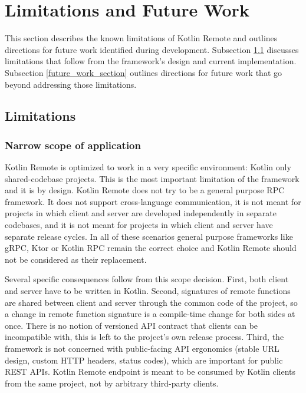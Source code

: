 \documentclass[a4paper,11pt,oneside]{article}
\begin{document}
\section{Limitations and Future Work}\label{limitations_and_future_work_section}

This section describes the known limitations of Kotlin Remote and outlines directions for
future work identified during development. Subsection \ref{limitations_section} discusses
limitations that follow from the framework's design and current implementation. Subsection
\ref{future_work_section} outlines directions for future work that go beyond addressing
those limitations.

\subsection{Limitations}\label{limitations_section}

\subsubsection{Narrow scope of application}\label{narrow_scope_section}

Kotlin Remote is optimized to work in a very specific environment: Kotlin only shared-codebase
projects. This is the most important limitation of the framework and it is by design.
Kotlin Remote does not try to be a general purpose RPC framework. It does not support
cross-language communication, it is not meant for projects in which client and server are developed
independently in separate codebases, and it is not meant for projects in which client and server
have separate release cycles. In all of these scenarios general purpose frameworks like gRPC, Ktor
or Kotlin RPC remain the correct choice and Kotlin Remote should not be considered as their
replacement.

Several specific consequences follow from this scope decision. First, both client and server have
to be written in Kotlin. Second, signatures of remote functions are shared between client and
server through the common code of the project, so a change in remote function signature is a
compile-time change for both sides at once. There is no notion of versioned API contract that
clients can be incompatible with, this is left to the project's own release process. Third, the
framework is not concerned with public-facing API ergonomics (stable URL design, custom HTTP
headers, status codes), which are important for public REST APIs. Kotlin Remote endpoint is meant
to be consumed by Kotlin clients from the same project, not by arbitrary third-party clients.
\end{document}
